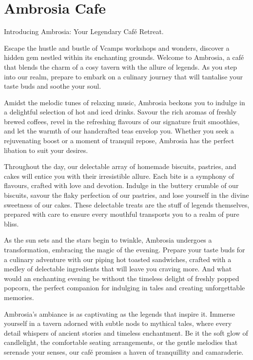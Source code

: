 \documentclass[a4paper, 11pt]{report}
\begin{document}
\chapter{Ambrosia Cafe}
Introducing Ambrosia: Your Legendary Café Retreat.\nl

Escape the hustle and bustle of Vcamps workshops and wonders, discover a hidden gem nestled within its enchanting grounds. Welcome to Ambrosia, a café that blends the charm of a cosy tavern with the allure of legends. As you step into our realm, prepare to embark on a culinary journey that will tantalise your taste buds and soothe your soul.\nl

Amidst the melodic tunes of relaxing music, Ambrosia beckons you to indulge in a delightful selection of hot and iced drinks. Savour the rich aromas of freshly brewed coffees, revel in the refreshing flavours of our signature fruit smoothies, and let the warmth of our handcrafted teas envelop you. Whether you seek a rejuvenating boost or a moment of tranquil repose, Ambrosia has the perfect libation to suit your desires.\nl

Throughout the day, our delectable array of homemade biscuits, pastries, and cakes will entice you with their irresistible allure. Each bite is a symphony of flavours, crafted with love and devotion. Indulge in the buttery crumble of our biscuits, savour the flaky perfection of our pastries, and lose yourself in the divine sweetness of our cakes. These delectable treats are the stuff of legends themselves, prepared with care to ensure every mouthful transports you to a realm of pure bliss.\nl

As the sun sets and the stars begin to twinkle, Ambrosia undergoes a transformation, embracing the magic of the evening. Prepare your taste buds for a culinary adventure with our piping hot toasted sandwiches, crafted with a medley of delectable ingredients that will leave you craving more. And what would an enchanting evening be without the timeless delight of freshly popped popcorn, the perfect companion for indulging in tales and creating unforgettable memories.\nl

Ambrosia's ambiance is as captivating as the legends that inspire it. Immerse yourself in a tavern adorned with subtle nods to mythical tales, where every detail whispers of ancient stories and timeless enchantment. Be it the soft glow of candlelight, the comfortable seating arrangements, or the gentle melodies that serenade your senses, our café promises a haven of tranquillity and camaraderie.\nl
\end{document}
